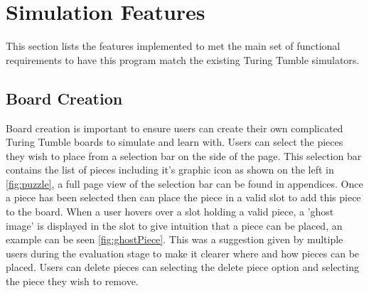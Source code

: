 \documentclass{l4proj}
\begin{document}


\section{Simulation Features}
This section lists the features implemented to met the main set of functional requirements to have this program match the existing Turing Tumble simulators.
 
\subsection{Board Creation}
Board creation is important to ensure users can create their own complicated Turing Tumble boards to simulate and learn with. Users can select the pieces they wish to place from a selection bar on the side of the page. This selection bar contains the list of pieces including it's graphic icon as shown on the left in \ref{fig:puzzle}, a full page view of the selection bar can be found in appendices. Once a piece has been selected then can place the piece in a valid slot to add this piece to the board. When a user hovers over a slot holding a valid piece, a 'ghost image' is displayed in the slot to give intuition that a piece can be placed, an example can be seen \ref{fig:ghostPiece}. This was a suggestion given by multiple users during the evaluation stage to make it clearer where and how pieces can be placed. Users can delete pieces can selecting the delete piece option and selecting the piece they wish to remove.
\end{document}
